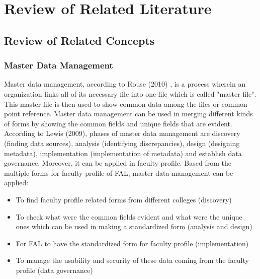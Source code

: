 \chapter{Review of Related Literature}

\section{Review of Related Concepts}

\subsection{Master Data Management}
Master data management, according to Rouse (2010) \nocite{ref:MasterData}, is a process wherein an organization links all of its necessary file into one file which is called "master file". This master file is then used to show common data among the files or common point reference. Master data management can be used in merging different kinds of forms by showing the common fields and unique fields that are evident. According to Lewis (2009), phases of master data management are discovery (finding data sources), analysis (identifying discrepancies), design (designing metadata), implementation (implementation of metadata) and establish data governance. Moreover, it can be applied in faculty profile. Based from the multiple forms for faculty profile of FAL, master data management can be applied:
\begin{itemize}
\item To find faculty profile related forms from different colleges (discovery)
\item To check what were the common fields evident and what were the unique ones which can be used in making a standardized form (analysis and design)
\item For FAL to have the standardized form for faculty profile (implementation)
\item To manage the usability and security of these data coming from the faculty profile (data governance)
\end{itemize}

